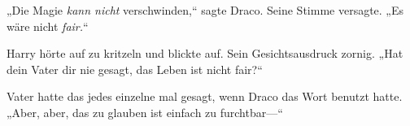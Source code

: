 „Die Magie \emph{kann nicht} verschwinden,“ sagte Draco. Seine Stimme versagte. „Es wäre nicht \emph{fair.}“

Harry hörte auf zu kritzeln und blickte auf. Sein Gesichtsausdruck zornig. „Hat dein Vater dir nie gesagt, das Leben ist nicht fair?“

Vater hatte das jedes einzelne mal gesagt, wenn Draco das Wort benutzt hatte. „Aber, aber, das zu glauben ist einfach zu furchtbar—“

